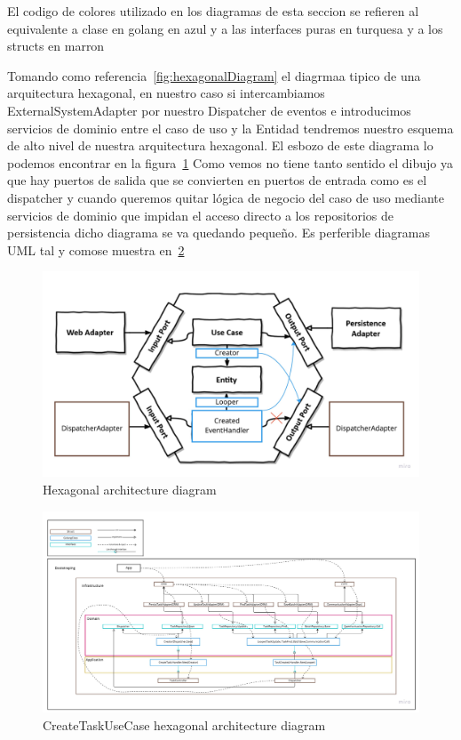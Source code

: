
El codigo de colores utilizado en los diagramas de esta seccion se refieren al equivalente a clase en golang en azul y a las interfaces puras en turquesa  y a los structs en marron

Tomando como referencia~\cref{fig:hexagonalDiagram} el diagrmaa tipico de una arquitectura hexagonal, en nuestro caso si intercambiamos ExternalSystemAdapter por nuestro Dispatcher de eventos e introducimos servicios de dominio entre el caso de uso y la Entidad tendremos nuestro esquema de alto nivel de nuestra arquitectura hexagonal. El esbozo de este diagrama lo podemos encontrar en la figura~\cref{fig:CreateTaskHexagonalDiagram} Como vemos no tiene tanto sentido el dibujo ya que hay puertos de salida que se convierten en puertos de entrada como es el dispatcher y cuando queremos quitar lógica de negocio del caso de uso mediante servicios de dominio que impidan el acceso directo a los repositorios de persistencia dicho diagrama se va quedando pequeño. Es perferible diagramas UML tal y comose muestra en~\cref{fig:createTaskUseCaseArchitecture}

\begin{figure}[H]
    \centering
    \includegraphics[height=0.3\textheight]{./part/Ejecucion/Seguimiento/CreateTaskUseCase/img/CreateTaskHexagonalDiagram}
    \caption{Hexagonal architecture diagram}\label{fig:CreateTaskHexagonalDiagram}
\end{figure}

\begin{figure}[H]
    \centering
    \includegraphics[height=0.3\textheight]{./part/Ejecucion/Seguimiento/CreateTaskUseCase/img/createTaskUseCaseArchitecture}
    \caption{CreateTaskUseCase hexagonal architecture diagram}\label{fig:createTaskUseCaseArchitecture}
\end{figure}

